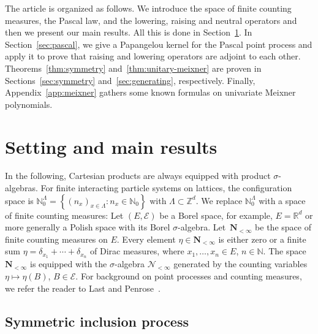 \documentclass[10pt,a4paper]{amsart}
\numberwithin{equation}{section}
\newcommand{\N}{\mathbb{N}}
\newcommand{\R}{\mathbb{R}}
\newcommand{\Z}{\mathbb{Z}}
\newcommand{\set}[1]{{\left \{ #1 \right \}}}
\newcommand{\1}{\mathbbm{1}}
\begin{document}
The article is organized as follows. We introduce the space of finite counting measures, the Pascal law, and the lowering, raising and neutral operators and then we present our main results. All this is done in Section~\ref{sec:setting-results}. In Section~\ref{sec:pascal}, we give a Papangelou kernel for the Pascal point process and apply it to prove that raising and lowering operators are adjoint to each other. Theorems~\ref{thm:symmetry} and~\ref{thm:unitary-meixner} are proven in Sections~\ref{sec:symmetry} and~\ref{sec:generating}, respectively. Finally, Appendix~\ref{app:meixner} gathers some known formulas on univariate Meixner polynomials.

\section{Setting and main results} \label{sec:setting-results}

In the following, Cartesian products are always equipped with product $\sigma$-algebras. For finite interacting particle systems on lattices, the configuration space is $\N_0^\Lambda = \set{(n_x)_{x\in \Lambda}\colon n_x \in \N_0}$ with $\Lambda\subset\Z^d$. We replace $\N_0^\Lambda$ with a space of finite counting measures:
Let $(E,\mathcal E)$ be a Borel space, for example, $E= \R^d$ or more generally a Polish space with its Borel $\sigma$-algebra. Let~$\mathbf N_{<\infty}$ be the space of finite counting measures on $E$. Every element $\eta \in \mathbf N_{<\infty}$ is either zero or a finite sum $\eta= \delta_{x_1}+\cdots + \delta_{x_n}$ of Dirac measures, where $x_1, \ldots, x_n \in E$, $n \in \N$. The space $\mathbf N_{<\infty}$ is equipped with the $\sigma$-algebra $\mathcal N_{<\infty}$ generated by the counting variables $\eta \mapsto \eta(B)$, $B\in \mathcal E$.
For background on point processes and counting measures, we refer the reader to Last and Penrose~\cite{LastPenroseLecturesOnThePoissonProcess}.

\subsection{Symmetric inclusion process}
\end{document}
